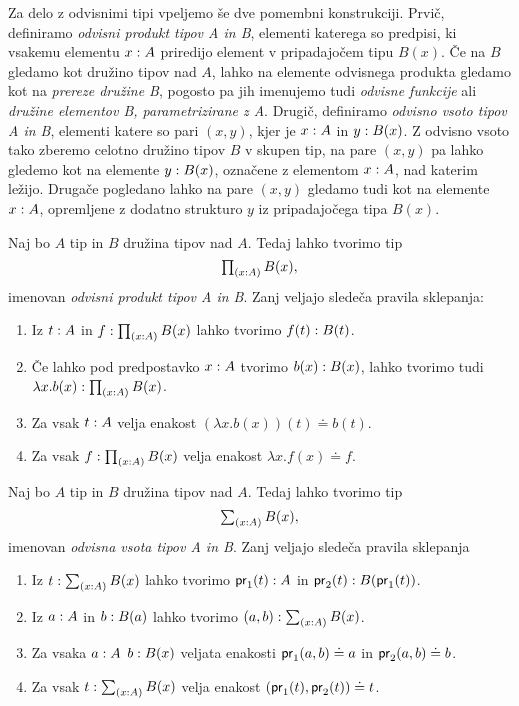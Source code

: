 Za delo z odvisnimi tipi vpeljemo še dve pomembni konstrukciji. Prvič, definiramo
\emph{odvisni produkt tipov A in B}, elementi katerega so predpisi, ki vsakemu elementu
\(x : A\) priredijo element v pripadajočem tipu \(B(x)\).
Če na \(B\) gledamo kot družino tipov
nad \(A\), lahko na elemente odvisnega produkta gledamo kot na \emph{prereze družine B},
pogosto pa jih imenujemo tudi \emph{odvisne funkcije} ali \emph{družine elementov B,
parametrizirane z A}. Drugič, definiramo \emph{odvisno vsoto tipov A in B}, elementi
katere so pari \((x, y)\), kjer je \(x : A\) in \(y : B(x)\).
Z odvisno vsoto tako zberemo celotno družino tipov \(B\) v skupen tip,
na pare \((x, y)\) pa lahko gledemo kot na elemente \(y : B(x)\), označene z
elementom \(x : A\), nad katerim ležijo.
Drugače pogledano lahko na pare \((x, y)\) gledamo tudi kot na elemente
\(x : A\), opremljene z dodatno strukturo \(y\) iz
pripadajočega tipa \(B(x)\).

\begin{definicija}
  Naj bo \(A\) tip in \(B\) družina tipov nad \(A\). Tedaj lahko tvorimo tip
  \[\textstyle \prod_{\left( x : A \right)} B(x),\] imenovan \emph{odvisni produkt tipov A in B}.
  Zanj veljajo sledeča pravila sklepanja:
  \begin{enumerate}
  \item Iz \(t : A\) in
    \(f : \textstyle \prod_{\left( x : A \right)} B(x)\) lahko tvorimo
    \(f(t) : B(t)\).
  \item Če lahko pod predpostavko \(x : A\) tvorimo
    \(b(x) : B(x)\), lahko tvorimo tudi
    \(\lambda x.b(x) : \textstyle \prod_{\left( x : A \right)} B(x)\).
  \item Za vsak \(t : A\) velja enakost \((\lambda x.b(x))(t) \doteq b(t)\).
  \item Za vsak \(f : \textstyle \prod_{\left( x : A \right)} B(x)\) velja enakost \(\lambda x.f(x) \doteq f\).
  \end{enumerate}
\end{definicija}

\begin{definicija}
  Naj bo \(A\) tip in \(B\) družina tipov nad \(A\). Tedaj lahko tvorimo tip
  \[\textstyle \sum_{\left( x : A \right)} B(x),\] imenovan \emph{odvisna vsota tipov A in B}.
  Zanj veljajo sledeča pravila sklepanja
  \begin{enumerate}
  \item Iz \(t : \textstyle \sum_{\left( x : A \right)} B(x)\) lahko tvorimo
    \(\textnormal{\textsf{pr}}_{1}(t) : A\) in
    \(\textnormal{\textsf{pr}}_{2}(t) : B(\textnormal{\textsf{pr}}_{1}(t))\).
  \item Iz \(a : A\) in \(b : B(a)\) lahko tvorimo
    \((a, b) : \textstyle \sum_{\left( x : A \right)} B(x)\).
  \item Za vsaka \(a : A\) \(b : B(x)\) veljata enakosti
    \(\textnormal{\textsf{pr}}_{1}(a, b) \doteq a\) in \(\textnormal{\textsf{pr}}_{2}(a, b) \doteq b\).
  \item Za vsak \(t : \textstyle \sum_{\left( x : A \right)} B(x)\) velja enakost
    \((\textnormal{\textsf{pr}}_{1}(t), \textnormal{\textsf{pr}}_{2}(t)) \doteq t\).
  \end{enumerate}
\end{definicija}

